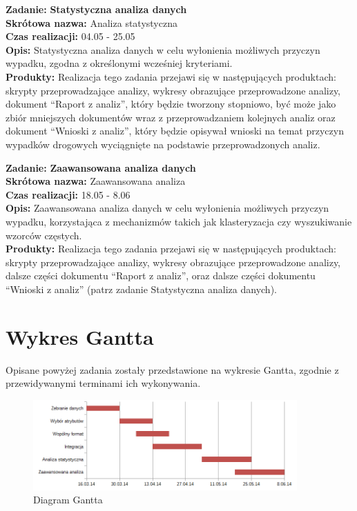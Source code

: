 \textbf{Zadanie:} \textbf{Statystyczna analiza danych}\\\textbf{Skrótowa
nazwa:} Analiza statystyczna\\\textbf{Czas realizacji:} 04.05 -
25.05\\\textbf{Opis:} Statystyczna analiza danych w celu wyłonienia
możliwych przyczyn wypadku, zgodna z określonymi wcześniej
kryteriami.\\\textbf{Produkty:} Realizacja tego zadania przejawi się w
następujących produktach: skrypty przeprowadzające analizy, wykresy
obrazujące przeprowadzone analizy, dokument ``Raport z analiz'', który
będzie tworzony stopniowo, być może jako zbiór mniejszych dokumentów
wraz z przeprowadzaniem kolejnych analiz oraz dokument ``Wnioski z
analiz'', który będzie opisywał wnioski na temat przyczyn wypadków
drogowych wyciągnięte na podstawie przeprowadzonych analiz.

\textbf{Zadanie:} \textbf{Zaawansowana analiza danych}\\\textbf{Skrótowa
nazwa:} Zaawansowana analiza\\\textbf{Czas realizacji:} 18.05 -
8.06\\\textbf{Opis:} Zaawansowana analiza danych w celu wyłonienia
możliwych przyczyn wypadku, korzystająca z mechanizmów takich jak
klasteryzacja czy wyszukiwanie wzorców częstych.\\\textbf{Produkty:}
Realizacja tego zadania przejawi się w następujących produktach: skrypty
przeprowadzające analizy, wykresy obrazujące przeprowadzone analizy,
dalsze części dokumentu ``Raport z analiz'', oraz dalsze części
dokumentu ``Wnioski z analiz'' (patrz zadanie Statystyczna analiza
danych).

\section{Wykres Gantta}\label{wykres-gantta}

Opisane powyżej zadania zostały przedstawione na wykresie Gantta,
zgodnie z przewidywanymi terminami ich wykonywania.

\begin{figure}[htbp]
\centering
\centerline{\includegraphics[width=0.9\textwidth]{images/gantt.png}}
\caption{Diagram Gantta}
\end{figure}

